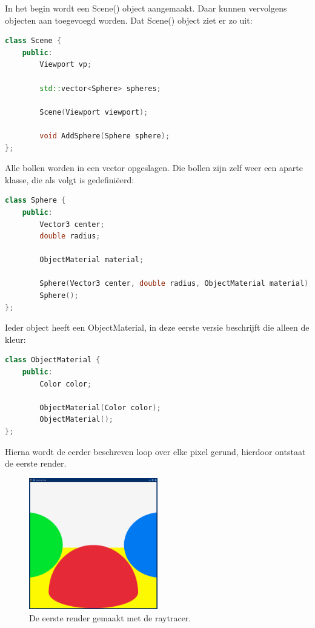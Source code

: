\documentclass[12pt, a4paper]{article}
\begin{document}
In het begin wordt een Scene() object aangemaakt. Daar kunnen vervolgens objecten aan toegevoegd worden. Dat Scene() object ziet er zo uit:

\begin{lstlisting}[language=C++]
class Scene {
    public:
        Viewport vp;

        std::vector<Sphere> spheres;

        Scene(Viewport viewport);

        void AddSphere(Sphere sphere);
};
\end{lstlisting}

Alle bollen worden in een vector opgeslagen. Die bollen zijn zelf weer een aparte klasse, die als volgt is gedefiniëerd:

\begin{lstlisting}[language=C++]
class Sphere {
    public:
        Vector3 center;
        double radius;

        ObjectMaterial material;

        Sphere(Vector3 center, double radius, ObjectMaterial material);
        Sphere();
};
\end{lstlisting}

Ieder object heeft een ObjectMaterial, in deze eerste versie beschrijft die alleen de kleur:

\begin{lstlisting}[language=C++]
class ObjectMaterial {
    public: 
        Color color;

        ObjectMaterial(Color color);
        ObjectMaterial();
};
\end{lstlisting}

Hierna wordt de eerder beschreven loop over elke pixel gerund, hierdoor ontstaat de eerste render.
\begin{figure}[H]
    \centering
    \includegraphics[width=0.50\textwidth]{renders/first_raytraced.png}
    \caption{De eerste render gemaakt met de raytracer.}
    \label{fig:first_raytraced}
\end{figure}
\end{document}
